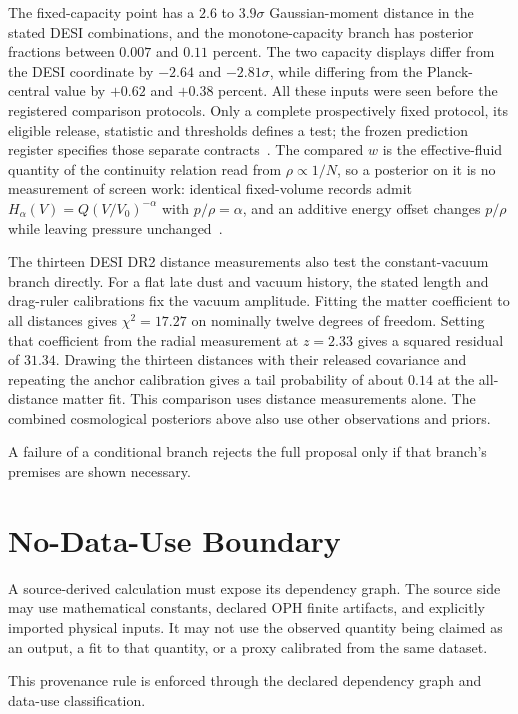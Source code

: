 \documentclass[11pt]{article}
\begin{document}
The fixed-capacity point has a \(2.6\) to \(3.9\sigma\) Gaussian-moment
distance in the stated DESI combinations, and the monotone-capacity branch
has posterior fractions between \(0.007\) and \(0.11\) percent. The two
capacity displays differ from the DESI coordinate by \(-2.64\) and
\(-2.81\sigma\), while differing from the Planck-central value by
\(+0.62\) and \(+0.38\) percent. All these inputs were seen before the
registered comparison protocols. Only a complete prospectively fixed
protocol, its eligible release, statistic and thresholds defines a test;
the frozen prediction register specifies those separate contracts~\cite{ophladder}.
The compared \(w\) is the effective-fluid quantity of the continuity relation
read from \(\rho\propto1/N\), so a posterior on it is no measurement of screen
work: identical fixed-volume records admit \(H_\alpha(V)=Q(V/V_0)^{-\alpha}\) with
\(p/\rho=\alpha\), and an additive energy offset changes \(p/\rho\) while leaving
pressure unchanged~\cite{ophobservers}.

The thirteen DESI DR2 distance measurements also test the constant-vacuum
branch directly. For a flat late dust and vacuum history, the stated length
and drag-ruler calibrations fix the vacuum amplitude. Fitting the matter
coefficient to all distances gives $\chi^2=17.27$ on nominally twelve
degrees of freedom. Setting that coefficient from the radial measurement at
$z=2.33$ gives a squared residual of $31.34$. Drawing the thirteen distances
with their released covariance and repeating the anchor calibration gives a
tail probability of about $0.14$ at the all-distance matter fit. This comparison
uses distance measurements alone. The combined cosmological posteriors above
also use other observations and priors.

A failure of a conditional branch rejects the full proposal only if that
branch's premises are shown necessary.

\section{No-Data-Use Boundary}

A source-derived calculation must expose its dependency graph. The source side
may use mathematical constants, declared OPH finite artifacts, and explicitly
imported physical inputs. It may not use the observed quantity being claimed as
an output, a fit to that quantity, or a proxy calibrated from the same dataset.

This provenance rule is enforced through the declared dependency graph and
data-use classification.
\end{document}
